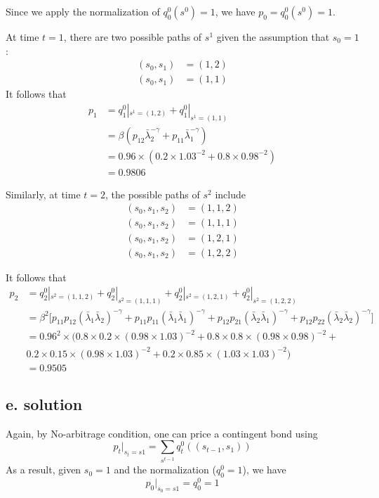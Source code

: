 \documentclass[11pt]{article}
\theoremstyle{definition}
\theoremstyle{boldtitle} %
\numberwithin{equation}{section}
\numberwithin{figure}{section}
\numberwithin{table}{section}
\begin{document}
Since we apply the normalization of $ q^0_0(s^0) = 1$, 
we have $p_0 = q^0_0(s^0) = 1$.

At time $t=1$, there are two possible paths of $s^1$ given the assumption that $s_0 = 1$:
\begin{align*}
  (s_0, s_1) & = (1, 2) \\ 
  (s_0, s_1) & = (1, 1)
\end{align*}
It follows that 
\begin{align*}
  p_1 & = q_1^0|_{s^1 = (1, 2)} + q_1^0|_{s^1 = (1, 1)}  \\
    & = \beta (p_{12} \bar{\lambda}_2^{-\gamma} + p_{11} \bar{\lambda}_1^{-\gamma}) \\ 
    & = 0.96 \times (0.2 \times 1.03^{-2} + 0.8 \times 0.98^{-2}) \\ 
    & = 0.9806
\end{align*}

Similarly, at time $t=2$, the possible paths of $s^2$ include
\begin{align*}
  (s_0, s_1, s_2) & = (1, 1, 2) \\ 
  (s_0, s_1, s_2) & = (1, 1, 1) \\
  (s_0, s_1, s_2) & = (1, 2, 1) \\
  (s_0, s_1, s_2) & = (1, 2, 2)
\end{align*}

It follows that 
\begin{align*}
  p_2 & = q_2^0|_{s^2 = (1, 1, 2)} + q_2^0|_{s^2 = (1, 1, 1)} + q_2^0|_{s^2 = (1, 2, 1)} + q_2^0|_{s^2 = (1, 2, 2)} \\
    & = \beta^2 \bigg[
      p_{11} p_{12} \left(\bar{\lambda}_1 \bar{\lambda}_2\right)^{-\gamma} +
      p_{11} p_{11} \left(\bar{\lambda}_1 \bar{\lambda}_1\right)^{-\gamma} +
      p_{12} p_{21} \left(\bar{\lambda}_2 \bar{\lambda}_1\right)^{-\gamma} +
      p_{12} p_{22} \left(\bar{\lambda}_2 \bar{\lambda}_2\right)^{-\gamma}
      \bigg] \\ 
    & = 0.96^2 \times (
      0.8 \times 0.2 \times (0.98 \times 1.03)^{-2} + 0.8 \times 0.8 \times (0.98 \times 0.98)^{-2} + \\
      & 0.2 \times 0.15 \times (0.98 \times 1.03)^{-2} + 
      0.2 \times 0.85 \times (1.03 \times 1.03)^{-2}) \\
    & = 0.9505
\end{align*}


\subsection{e. solution}
Again, by No-arbitrage condition, one can price a contingent bond using
\[
p_t|_{s_t = s1} = \sum_{s^{t-1}} q^0_t((s_{t-1}, s_1))
\]
As a result, given $s_0 = 1$ and the normalization ($q^0_0 = 1$), we have
\[
p_0|_{s_0 = s1} = q^0_0 = 1
\]
\end{document}
